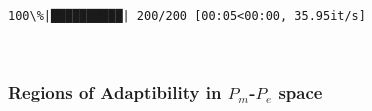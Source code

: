 \documentclass[11pt]{article}
\begin{document}
    \begin{Verbatim}[commandchars=\\\{\}]
100\%|██████████| 200/200 [00:05<00:00, 35.95it/s]
    \end{Verbatim}

    \begin{center}
    \end{center}
    { \hspace*{\fill} \\}
    
    \hypertarget{regions-of-adaptibility-in-p_m-p_e-space}{%
\subsubsection{\texorpdfstring{Regions of Adaptibility in
\(P_m\)-\(P_e\)
space}{Regions of Adaptibility in P\_m-P\_e space}}\label{regions-of-adaptibility-in-p_m-p_e-space}}
\end{document}
